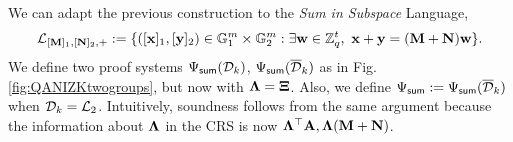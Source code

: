 We can adapt the previous construction to the \textit{Sum in Subspace} Language, 
 $$\mathcal{L}_{[\mathbf{{M}}]_1,[\mathbf{{N}}]_2,+}:=\{ ([\mathbf{x}]_1,[\mathbf{y}]_2) \in \mathbb{G}_1^{m} \times \mathbb{G}_2^{m} :  \exists \mathbf{w} \in \mathbb{Z}_q^{t}, \  \mathbf{x}+\mathbf{y}=(\mathbf{{M}}+\mathbf{{N}}) \mathbf{w}\}.$$
 We define two proof systems $\Psi_{\mathsf{sum}}(\mathcal{D}_k)$, $\Psi_{\mathsf{sum}}(\overline{\mathcal{D}}_k)$ as in Fig. \ref{fig:QANIZKtwogroups}, but now 
with $\mathbf{{\Lambda}}=\mathbf{{\Xi}}$. Also, we define $\Psi_{\mathsf{sum}}:=\Psi_{\mathsf{sum}}(\overline{\mathcal{D}}_k)$ when $\mathcal{D}_k=\mathcal{L}_2$.
Intuitively, soundness follows from the same argument 
because the information 
about $\mathbf{{\Lambda}}$ in the CRS is now $\mathbf{{\Lambda}}^{\top}\mathbf{{A}},\mathbf{{\Lambda}}(\mathbf{{M}}+\mathbf{{N}})$.
